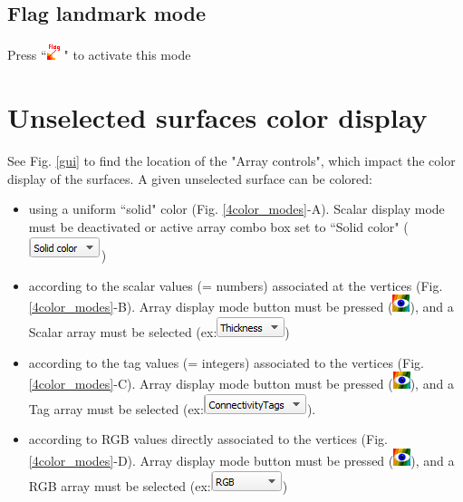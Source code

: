 \subsection{Flag landmark mode}	
Press ``\includegraphics[scale=0.7]{images/04/flag_landmarks.png}" to activate this mode


 \section{Unselected surfaces color display}
See Fig. \ref{gui} to find the location of the "Array controls", which impact the color display of the surfaces.
 A given unselected surface can be colored: 
\begin{itemize}
\item using a uniform ``solid" color (Fig. \ref{4color_modes}-A). Scalar display mode must be deactivated or active array combo box set to ``Solid color" (\includegraphics[scale=0.5]{images/04/scalarcombo_solidcolor.png})
\item	according to the scalar values (= numbers) associated at the vertices (Fig. \ref{4color_modes}-B). Array display mode button must be pressed (\includegraphics[scale=0.7]{images/04/show_color_scale.png}), and a Scalar array must be selected (ex:\includegraphics[scale=0.5]{images/04/scalarcombo_scalar.png})
\item according to the tag values (= integers) associated to the vertices (Fig. \ref{4color_modes}-C). Array display mode button must be pressed (\includegraphics[scale=0.7]{images/04/show_color_scale.png}), and a Tag array must be selected (ex:\includegraphics[scale=0.5]{images/04/scalarcombo_tag.png}).
\item	according to RGB values directly associated to the vertices (Fig. \ref{4color_modes}-D). Array display mode button must be pressed (\includegraphics[scale=0.7]{images/04/show_color_scale.png}), and a RGB array must be selected (ex:\includegraphics[scale=0.5]{images/04/scalarcombo_rgb.png}) 
\end{itemize}

